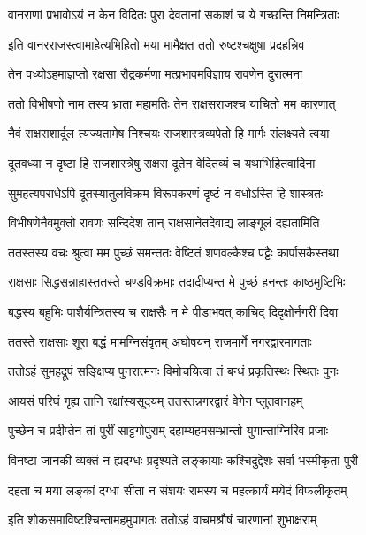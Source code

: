\twolineshloka
{वानराणां प्रभावोऽयं न केन विदितः पुरा}
{देवतानां सकाशं च ये गच्छन्ति निमन्त्रिताः} %

\twolineshloka
{इति वानरराजस्त्वामाहेत्यभिहितो मया}
{मामैक्षत ततो रुष्टश्चक्षुषा प्रदहन्निव} %

\twolineshloka
{तेन वध्योऽहमाज्ञप्तो रक्षसा रौद्रकर्मणा}
{मत्प्रभावमविज्ञाय रावणेन दुरात्मना} %

\twolineshloka
{ततो विभीषणो नाम तस्य भ्राता महामतिः}
{तेन राक्षसराजश्च याचितो मम कारणात्} %

\twolineshloka
{नैवं राक्षसशार्दूल त्यज्यतामेष निश्चयः}
{राजशास्त्रव्यपेतो हि मार्गः संलक्ष्यते त्वया} %

\twolineshloka
{दूतवध्या न दृष्टा हि राजशास्त्रेषु राक्षस}
{दूतेन वेदितव्यं च यथाभिहितवादिना} %

\twolineshloka
{सुमहत्यपराधेऽपि दूतस्यातुलविक्रम}
{विरूपकरणं दृष्टं न वधोऽस्ति हि शास्त्रतः} %

\twolineshloka
{विभीषणेनैवमुक्तो रावणः सन्दिदेश तान्}
{राक्षसानेतदेवाद्य लाङ्गूलं दह्यतामिति} %

\twolineshloka
{ततस्तस्य वचः श्रुत्वा मम पुच्छं समन्ततः}
{वेष्टितं शणवल्कैश्च पट्टैः कार्पासकैस्तथा} %

\twolineshloka
{राक्षसाः सिद्धसन्नाहास्ततस्ते चण्डविक्रमाः}
{तदादीप्यन्त मे पुच्छं हनन्तः काष्ठमुष्टिभिः} %

\twolineshloka
{बद्धस्य बहुभिः पाशैर्यन्त्रितस्य च राक्षसैः}
{न मे पीडाभवत् काचिद् दिदृक्षोर्नगरीं दिवा} %

\twolineshloka
{ततस्ते राक्षसाः शूरा बद्धं मामग्निसंवृतम्}
{अघोषयन् राजमार्गे नगरद्वारमागताः} %

\twolineshloka
{ततोऽहं सुमहद्रूपं सङ्क्षिप्य पुनरात्मनः}
{विमोचयित्वा तं बन्धं प्रकृतिस्थः स्थितः पुनः} %

\twolineshloka
{आयसं परिघं गृह्य तानि रक्षांस्यसूदयम्}
{ततस्तन्नगरद्वारं वेगेन प्लुतवानहम्} %

\twolineshloka
{पुच्छेन च प्रदीप्तेन तां पुरीं साट्टगोपुराम्}
{दहाम्यहमसम्भ्रान्तो युगान्ताग्निरिव प्रजाः} %

\twolineshloka
{विनष्टा जानकी व्यक्तं न ह्यदग्धः प्रदृश्यते}
{लङ्कायाः कश्चिदुद्देशः सर्वा भस्मीकृता पुरी} %

\twolineshloka
{दहता च मया लङ्कां दग्धा सीता न संशयः}
{रामस्य च महत्कार्यं मयेदं विफलीकृतम्} %

\twolineshloka
{इति शोकसमाविष्टश्चिन्तामहमुपागतः}
{ततोऽहं वाचमश्रौषं चारणानां शुभाक्षराम्} %

